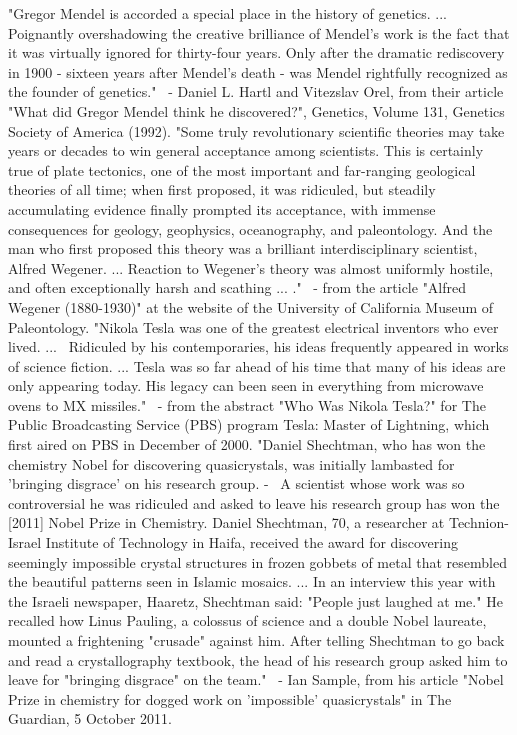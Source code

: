 \documentclass[12pt]{article}
\begin{document}
"Gregor Mendel is accorded a special place in the history of genetics. ... Poignantly overshadowing the creative brilliance of Mendel's work is the fact that it was virtually ignored for thirty-four years. Only after the dramatic rediscovery in 1900 - sixteen years after Mendel's death - was Mendel rightfully recognized as the founder of genetics."  - Daniel L. Hartl and Vitezslav Orel, from their article "What did Gregor Mendel think he discovered?", Genetics, Volume 131, Genetics Society of America (1992).
"Some truly revolutionary scientific theories may take years or decades to win general acceptance among scientists. This is certainly true of plate tectonics, one of the most important and far-ranging geological theories of all time; when first proposed, it was ridiculed, but steadily accumulating evidence finally prompted its acceptance, with immense consequences for geology, geophysics, oceanography, and paleontology. And the man who first proposed this theory was a brilliant interdisciplinary scientist, Alfred Wegener. ... Reaction to Wegener's theory was almost uniformly hostile, and often exceptionally harsh and scathing ... ."  - from the article "Alfred Wegener (1880-1930)" at the website of the University of California Museum of Paleontology.
"Nikola Tesla was one of the greatest electrical inventors who ever lived. ...  Ridiculed by his contemporaries, his ideas frequently appeared in works of science fiction. ... Tesla was so far ahead of his time that many of his ideas are only appearing today. His legacy can been seen in everything from microwave ovens to MX missiles."  - from the abstract "Who Was Nikola Tesla?" for The Public Broadcasting Service (PBS) program Tesla: Master of Lightning, which first aired on PBS in December of 2000.
"Daniel Shechtman, who has won the chemistry Nobel for discovering quasicrystals, was initially lambasted for 'bringing disgrace' on his research group. -  A scientist whose work was so controversial he was ridiculed and asked to leave his research group has won the [2011] Nobel Prize in Chemistry. Daniel Shechtman, 70, a researcher at Technion-Israel Institute of Technology in Haifa, received the award for discovering seemingly impossible crystal structures in frozen gobbets of metal that resembled the beautiful patterns seen in Islamic mosaics. ... In an interview this year with the Israeli newspaper, Haaretz, Shechtman said: "People just laughed at me." He recalled how Linus Pauling, a colossus of science and a double Nobel laureate, mounted a frightening "crusade" against him. After telling Shechtman to go back and read a crystallography textbook, the head of his research group asked him to leave for "bringing disgrace" on the team."  - Ian Sample, from his article "Nobel Prize in chemistry for dogged work on 'impossible' quasicrystals" in The Guardian, 5 October 2011.
\end{document}
